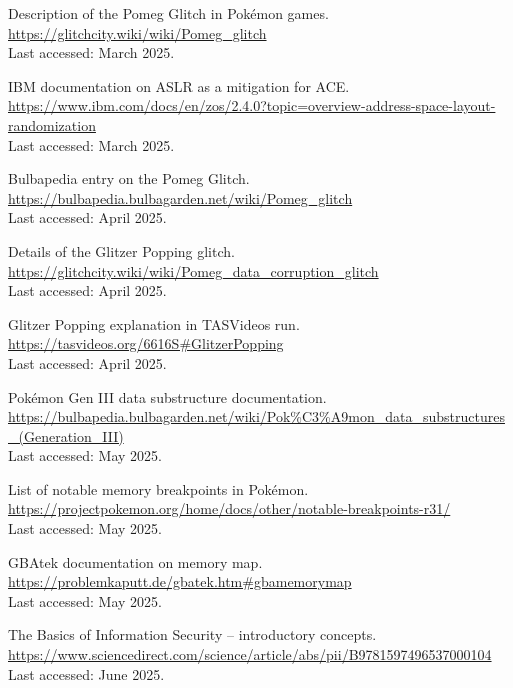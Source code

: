 \documentclass[a4paper]{usiinfbachelorproject}
\begin{document}
\begin{thebibliography}{99}
	Description of the Pomeg Glitch in Pokémon games.\\
	\url{https://glitchcity.wiki/wiki/Pomeg_glitch}\\
	Last accessed: March 2025.

	IBM documentation on ASLR as a mitigation for ACE.\\
	\url{https://www.ibm.com/docs/en/zos/2.4.0?topic=overview-address-space-layout-randomization}\\
	Last accessed: March 2025.





	Bulbapedia entry on the Pomeg Glitch.\\
	\url{https://bulbapedia.bulbagarden.net/wiki/Pomeg_glitch}\\
	Last accessed: April 2025.


	Details of the Glitzer Popping glitch.\\
	\url{https://glitchcity.wiki/wiki/Pomeg_data_corruption_glitch}\\
	Last accessed: April 2025.


	Glitzer Popping explanation in TASVideos run.\\
	\url{https://tasvideos.org/6616S#GlitzerPopping}\\
	Last accessed: April 2025.


	Pokémon Gen III data substructure documentation.\\
	\url{https://bulbapedia.bulbagarden.net/wiki/Pok%C3%A9mon_data_substructures_(Generation_III)}\\
	Last accessed: May 2025.


	List of notable memory breakpoints in Pokémon.\\
	\url{https://projectpokemon.org/home/docs/other/notable-breakpoints-r31/}\\
	Last accessed: May 2025.


	GBAtek documentation on memory map.\\
	\url{https://problemkaputt.de/gbatek.htm#gbamemorymap}\\
	Last accessed: May 2025.


	The Basics of Information Security – introductory concepts.\\
	\url{https://www.sciencedirect.com/science/article/abs/pii/B9781597496537000104}\\
	Last accessed: June 2025.



\end{thebibliography}
\end{document}
